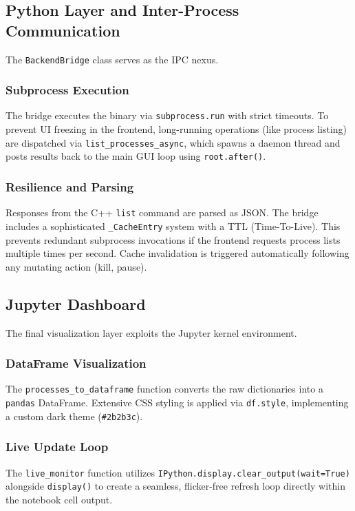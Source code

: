 \documentclass{article}
\begin{document}
\subsection{Python Layer and Inter-Process Communication}
The \texttt{BackendBridge} class serves as the IPC nexus.

\subsubsection{Subprocess Execution}
The bridge executes the binary via \texttt{subprocess.run} with strict timeouts. To prevent UI freezing in the frontend, long-running operations (like process listing) are dispatched via \texttt{list\_processes\_async}, which spawns a daemon thread and posts results back to the main GUI loop using \texttt{root.after()}.

\subsubsection{Resilience and Parsing}
Responses from the C++ \texttt{list} command are parsed as JSON. The bridge includes a sophisticated \texttt{\_CacheEntry} system with a TTL (Time-To-Live). This prevents redundant subprocess invocations if the frontend requests process lists multiple times per second. Cache invalidation is triggered automatically following any mutating action (kill, pause).

\subsection{Jupyter Dashboard}
The final visualization layer exploits the Jupyter kernel environment. 

\subsubsection{DataFrame Visualization}
The \texttt{processes\_to\_dataframe} function converts the raw dictionaries into a \texttt{pandas} DataFrame. Extensive CSS styling is applied via \texttt{df.style}, implementing a custom dark theme (\texttt{\#2b2b3c}). 

\subsubsection{Live Update Loop}
The \texttt{live\_monitor} function utilizes \texttt{IPython.display.clear\_output(wait=True)} alongside \texttt{display()} to create a seamless, flicker-free refresh loop directly within the notebook cell output.
\end{document}
